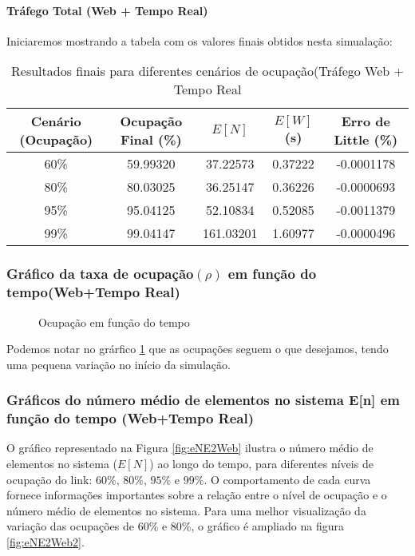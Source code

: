 \paragraph{Tráfego Total (Web + Tempo Real)}
Iniciaremos mostrando a tabela com os valores finais obtidos nesta simualação:
\begin{table}[H]
    \centering
    \begin{tabular}{|c|c|c|c|c|}
        \hline
        \textbf{Cenário (Ocupação)} & \textbf{Ocupação Final (\%)} & \textbf{$E[N]$} & \textbf{$E[W]$ (s)} & \textbf{Erro de Little (\%)} \\ 
        \hline
        60\% & 59.99320 & 37.22573  & 0.37222  & -0.0001178 \\ 
        80\% & 80.03025 & 36.25147 & 0.36226 & -0.0000693 \\ 
        95\% & 95.04125 & 52.10834 & 0.52085 & -0.0011379 \\ 
        99\% & 99.04147 & 161.03201 &1.60977 & -0.0000496 \\ 
        \hline
    \end{tabular}
    \caption{Resultados finais para diferentes cenários de ocupação(Tráfego Web + Tempo Real}
    \label{tab:resultados}
\end{table}

\subsubsection{Gráfico da taxa de ocupação$(\rho)$ em função do tempo(Web+Tempo Real)}
\begin{figure}[h!]
   \centering
   
   \caption{Ocupação em função do tempo}
   \label{fig:ocupacaoE2Web}
\end{figure}
Podemos notar no grárfico \ref{fig:ocupacaoE2Web} que as ocupações seguem o que desejamos, tendo uma pequena variação no início da simulação.

\subsubsection{Gráficos do número médio de elementos no sistema E[n] em função do tempo (Web+Tempo Real)}
O gráfico representado na Figura \ref{fig:eNE2Web} ilustra o número médio de elementos no sistema (\(E[N]\)) ao longo do tempo, para diferentes níveis de ocupação do link: \(60\%\), \(80\%\), \(95\%\) e \(99\%\). O comportamento de cada curva fornece informações importantes sobre a relação entre o nível de ocupação e o número médio de elementos no sistema.
Para uma melhor visualização da variação das ocupações de 60\% e 80\%, o gráfico é ampliado na figura \ref{fig:eNE2Web2}.

